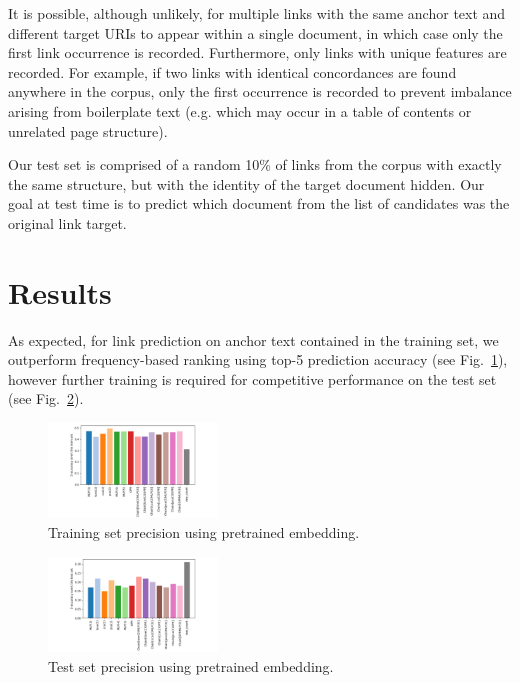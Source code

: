 \documentclass[sigconf,authordraft]{acmart}
\begin{document}
It is possible, although unlikely, for multiple links with the same anchor text and different target URIs to appear within a single document, in which case only the first link occurrence is recorded. Furthermore, only links with unique features are recorded. For example, if two links with identical concordances are found anywhere in the corpus, only the first occurrence is recorded to prevent imbalance arising from boilerplate text (e.g. which may occur in a table of contents or unrelated page structure).

Our test set is comprised of a random 10\% of links from the corpus with exactly the same structure, but with the identity of the target document hidden. Our goal at test time is to predict which document from the list of candidates was the original link target.


\section{Results}

As expected, for link prediction on anchor text contained in the training set, we outperform frequency-based ranking using top-5 prediction accuracy (see Fig.~\ref{fig:training_set}), however further training is required for competitive performance on the test set (see Fig.~\ref{fig:test_set}).

\begin{figure}
    \centering
    \includegraphics[width=0.4\textwidth,keepaspectratio]{training_set.png}
    \caption{Training set precision using pretrained embedding.}
    \label{fig:training_set}
\end{figure}

\begin{figure}
    \centering
    \includegraphics[width=0.4\textwidth,keepaspectratio]{test_set.png}
    \caption{Test set precision using pretrained embedding.}
    \label{fig:test_set}
\end{figure}
\end{document}

